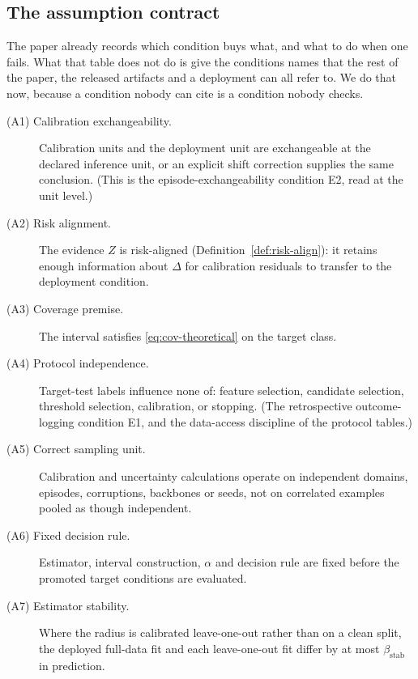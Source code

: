 \subsection{The assumption contract}\label{ass:contract}

The paper already records which condition buys what, and what to do when one
fails. What that table does not do is give the conditions names that the
rest of the paper, the released artifacts and a deployment can all refer to. We do that
now, because a condition nobody can cite is a condition nobody checks.

\begin{description}
  \item[\textnormal{(A1)} Calibration exchangeability.] Calibration units and the
    deployment unit are exchangeable at the declared inference unit, or an explicit
    shift correction supplies the same conclusion. (This is the episode-exchangeability condition E2, read at the unit level.)
  \item[\textnormal{(A2)} Risk alignment.] The evidence $Z$ is risk-aligned
    (Definition~\ref{def:risk-align}): it retains enough information about $\Delta$ for
    calibration residuals to transfer to the deployment condition.
  \item[\textnormal{(A3)} Coverage premise.] The interval satisfies
    \eqref{eq:cov-theoretical} on the target class.
  \item[\textnormal{(A4)} Protocol independence.] Target-test labels influence none of:
    feature selection, candidate selection, threshold selection, calibration, or
    stopping. (The retrospective outcome-logging condition E1, and the data-access
    discipline of the protocol tables.)
  \item[\textnormal{(A5)} Correct sampling unit.] Calibration and uncertainty
    calculations operate on independent domains, episodes, corruptions, backbones or
    seeds, not on correlated examples pooled as though independent.
  \item[\textnormal{(A6)} Fixed decision rule.] Estimator, interval construction,
    $\alpha$ and decision rule are fixed before the promoted target conditions are
    evaluated.
  \item[\textnormal{(A7)} Estimator stability.] Where the radius is calibrated
    leave-one-out rather than on a clean split, the deployed full-data fit and each
    leave-one-out fit differ by at most $\beta_{\mathrm{stab}}$ in prediction.
\end{description}

